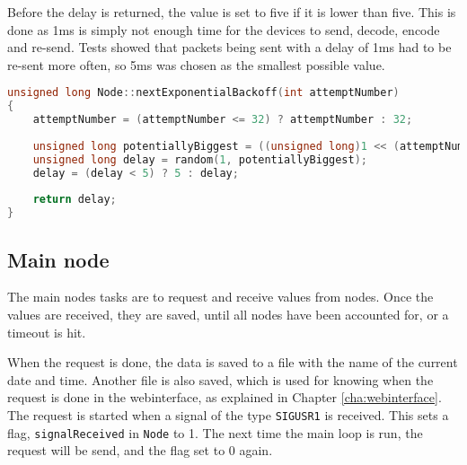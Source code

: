 Before the delay is returned, the value is set to five if it is lower than five. This is done as 1ms is simply not enough time for the devices to send, decode, encode and re-send. Tests showed that packets being sent with a delay of 1ms had to be re-sent more often, so 5ms was chosen as the smallest possible value.
\begin{lstlisting}[language=C,caption={Exponential backoff on the sensor nodes. In Node.cpp.},label={lst:expbackoff}]
unsigned long Node::nextExponentialBackoff(int attemptNumber)
{
    attemptNumber = (attemptNumber <= 32) ? attemptNumber : 32;
    
    unsigned long potentiallyBiggest = ((unsigned long)1 << (attemptNumber - 1));
    unsigned long delay = random(1, potentiallyBiggest);
    delay = (delay < 5) ? 5 : delay;
    
    return delay;
}
\end{lstlisting}


\subsection{Main node} \label{cha:signalhandling}
The main nodes tasks are to request and receive values from nodes. Once the values are received, they are saved, until all nodes have been accounted for, or a timeout is hit.

When the request is done, the data is saved to a file with the name of the current date and time. Another file is also saved, which is used for knowing when the request is done in the webinterface, as explained in Chapter \ref{cha:webinterface}. The request is started when a signal of the type \texttt{SIGUSR1} is received. This sets a flag, \texttt{signalReceived} in \texttt{Node} to 1. The next time the main loop is run, the request will be send, and the flag set to 0 again.